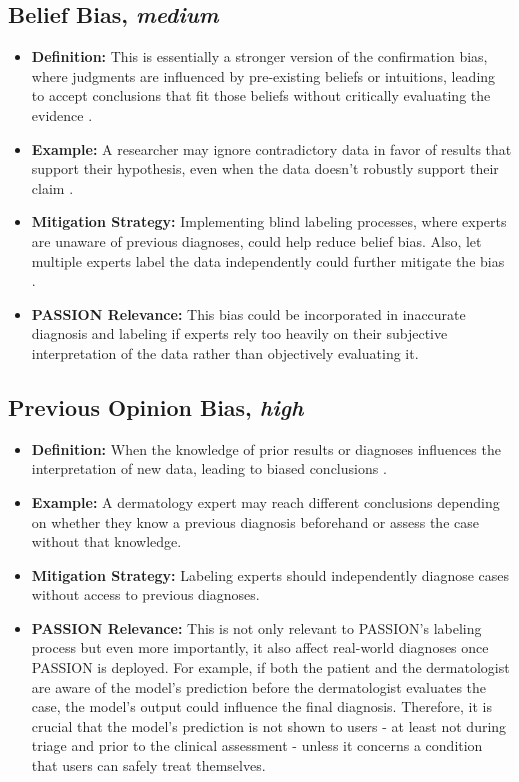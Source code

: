 \documentclass[12pt, a4paper, oneside]{book}   	%
\begin{document}
\begin{appendices}
		\subsection{Belief Bias, \textit{medium}}
		\begin{itemize}
			\item \textbf{Definition:} This is essentially a stronger version of the confirmation bias, where judgments are influenced by pre-existing beliefs or intuitions, leading to accept conclusions that fit those beliefs without critically evaluating the evidence \autocite{Mester_2017}.
			\item \textbf{Example:} A researcher may ignore contradictory data in favor of results that support their hypothesis, even when the data doesn't robustly support their claim \autocite{Mester_2017}.
			\item \textbf{Mitigation Strategy:} Implementing blind labeling processes, where experts are unaware of previous diagnoses, could help reduce belief bias. Also, let multiple experts label the data independently could further mitigate the bias .
			\item \textbf{PASSION Relevance:} This bias could be incorporated in inaccurate diagnosis and labeling if experts rely too heavily on their subjective interpretation of the data rather than objectively evaluating it.
		\end{itemize}
		
		\subsection{Previous Opinion Bias, \textit{high}}
		\begin{itemize}
			\item \textbf{Definition:} When the knowledge of prior results or diagnoses influences the interpretation of new data, leading to biased conclusions \autocite{Chakraborty_2024}.
			\item \textbf{Example:} A dermatology expert may reach different conclusions depending on whether they know a previous diagnosis beforehand or assess the case without that knowledge.
			\item \textbf{Mitigation Strategy:} Labeling experts should independently diagnose cases without access to previous diagnoses.
			\item \textbf{PASSION Relevance:} This is not only relevant to PASSION's labeling process but even more importantly, it also affect real-world diagnoses once PASSION is deployed. For example, if both the patient and the dermatologist are aware of the model's prediction before the dermatologist evaluates the case, the model's output could influence the final diagnosis. Therefore, it is crucial that the model’s prediction is not shown to users - at least not during triage and prior to the clinical assessment - unless it concerns a condition that users can safely treat themselves.
		\end{itemize}
		

\end{appendices}
\end{document}
